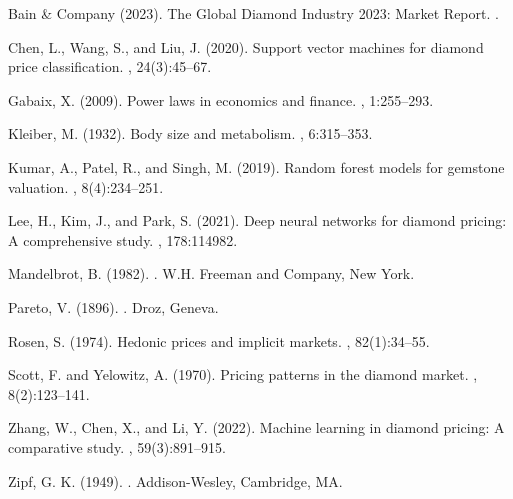 \documentclass[12pt,a4paper]{article}
\begin{document}


\begin{thebibliography}{99}

Bain \& Company (2023).
\newblock The Global Diamond Industry 2023: Market Report.
.

Chen, L., Wang, S., and Liu, J. (2020).
\newblock Support vector machines for diamond price classification.
, 24(3):45--67.

Gabaix, X. (2009).
\newblock Power laws in economics and finance.
, 1:255--293.

Kleiber, M. (1932).
\newblock Body size and metabolism.
, 6:315--353.

Kumar, A., Patel, R., and Singh, M. (2019).
\newblock Random forest models for gemstone valuation.
, 8(4):234--251.

Lee, H., Kim, J., and Park, S. (2021).
\newblock Deep neural networks for diamond pricing: A comprehensive study.
, 178:114982.

Mandelbrot, B. (1982).
.
\newblock W.H. Freeman and Company, New York.

Pareto, V. (1896).
.
\newblock Droz, Geneva.

Rosen, S. (1974).
\newblock Hedonic prices and implicit markets.
, 82(1):34--55.

Scott, F. and Yelowitz, A. (1970).
\newblock Pricing patterns in the diamond market.
, 8(2):123--141.

Zhang, W., Chen, X., and Li, Y. (2022).
\newblock Machine learning in diamond pricing: A comparative study.
, 59(3):891--915.

Zipf, G. K. (1949).
.
\newblock Addison-Wesley, Cambridge, MA.

\end{thebibliography}
\end{document}
